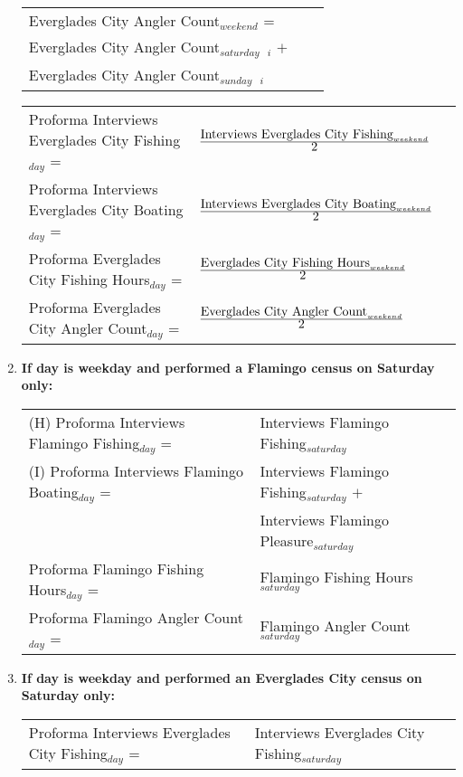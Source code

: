 \documentclass[letterpaper,12pt]{article}
\newcommand{\hspacer}{\hspace*{1cm}}
\newcommand{\fraction}[1]{\textrm{\normalsize{#1}}}
\begin{document}
\begin{enumerate}
\begin{tabular}{l@{ }l@{ }l}
\hspacer \hspacer Everglades City Angler Count$_{weekend}$ = \\
\hspacer \hspacer \hspacer Everglades City Angler Count$_{saturday}$\ $_{i}$ $+$ \\
\hspacer \hspacer \hspacer Everglades City Angler Count$_{sunday}$\ $_{i}$ \\
\end{tabular}

\begin{tabular}{l@{ }l@{ }l}
	Proforma Interviews Everglades City Fishing$_{day}$ =
		& $
\frac
	{\fraction{Interviews Everglades City Fishing}_{weekend}}
      	{\fraction{2}}
		$ \\
	Proforma Interviews Everglades City Boating$_{day}$ =
		& $
\frac
	{\fraction{Interviews Everglades City Boating}_{weekend}}
      	{\fraction{2}}
		$ \\
	Proforma Everglades City Fishing Hours$_{day}$ =
		& $
\frac
	{\fraction{Everglades City Fishing Hours}_{weekend}}
	{\fraction{2}}
		$ \\
	Proforma Everglades City Angler Count$_{day}$ =
		& $
\frac
	{\fraction{Everglades City Angler Count}_{weekend}}
	{\fraction{2}}
		$ \\
\end{tabular}

\item
\textbf{If day is weekday and performed a Flamingo census on Saturday only:} \\
\begin{tabular}{l@{ }l@{ }l}
	(H) Proforma Interviews Flamingo Fishing$_{day}$ =
		& Interviews Flamingo Fishing$_{saturday}$ \\

	(I) Proforma Interviews Flamingo Boating$_{day}$ =
		& Interviews Flamingo Fishing$_{saturday}$ $+$ \\
		& Interviews Flamingo Pleasure$_{saturday}$ \\

	Proforma Flamingo Fishing Hours$_{day}$ =
		& Flamingo Fishing Hours$_{saturday}$ \\

	Proforma Flamingo Angler Count$_{day}$ =
		& Flamingo Angler Count$_{saturday}$ \\
\end{tabular}

\item
\textbf{If day is weekday and performed an Everglades City census on Saturday only:} \\
\begin{tabular}{l@{ }l@{ }l}
	Proforma Interviews Everglades City Fishing$_{day}$ =
		& Interviews Everglades City Fishing$_{saturday}$ \\


\end{tabular}
\end{enumerate}
\end{document}
